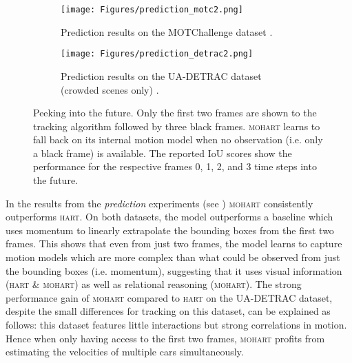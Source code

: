\begin{figure}
    \centering
    \begin{subfigure}[c]{0.99\linewidth}
        \centering
        \texttt{[image: Figures/prediction\_motc2.png]}
        \vspace{-6mm}
        \caption{Prediction results on the MOTChallenge dataset \cite{MOT16}.}
        \label{fig:MOTC_imgs}
    \end{subfigure}
    \vspace{2mm}
    \begin{subfigure}[c]{0.99\linewidth}
        \centering
        \texttt{[image: Figures/prediction\_detrac2.png]}
        \vspace{-6mm}
        \caption{Prediction results on the UA-DETRAC dataset (crowded scenes only) \cite{Wen15}.}
        \label{fig:Detrac_quant}
    \vspace{-5mm}
    \end{subfigure}
\caption{Peeking into the future. Only the first two frames are shown to the tracking algorithm followed by three black frames. \textsc{mohart} learns to fall back on its internal motion model when no observation (i.e. only a black frame) is available. The reported IoU scores show the performance for the respective frames 0, 1, 2, and 3 time steps into the future.
\label{fig:prediction}
}
\end{figure}

In the results from the \textit{prediction} experiments (see ) \textsc{mohart} consistently outperforms \textsc{hart}. On both datasets, the model outperforms a baseline which uses momentum to linearly extrapolate the bounding boxes from the first two frames. This shows that even from just two frames, the model learns to capture motion models which are more complex than what could be observed from just the bounding boxes (i.e. momentum), suggesting that it uses visual information (\textsc{hart} \& \textsc{mohart}) as well as relational reasoning (\textsc{mohart}). The strong performance gain of \textsc{mohart} compared to \textsc{hart} on the UA-DETRAC dataset, despite the small differences for tracking on this dataset, can be explained as follows: this dataset features little interactions but strong correlations in motion. Hence when only having access to the first two frames, \textsc{mohart} profits from estimating the velocities of multiple cars simultaneously.
